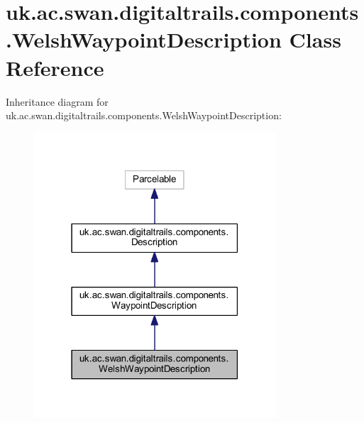 \hypertarget{classuk_1_1ac_1_1swan_1_1digitaltrails_1_1components_1_1_welsh_waypoint_description}{\section{uk.\+ac.\+swan.\+digitaltrails.\+components.\+Welsh\+Waypoint\+Description Class Reference}
\label{classuk_1_1ac_1_1swan_1_1digitaltrails_1_1components_1_1_welsh_waypoint_description}
}


Inheritance diagram for uk.\+ac.\+swan.\+digitaltrails.\+components.\+Welsh\+Waypoint\+Description\+:\nopagebreak
\begin{figure}[H]
\begin{center}
\leavevmode
\includegraphics[width=255pt]{classuk_1_1ac_1_1swan_1_1digitaltrails_1_1components_1_1_welsh_waypoint_description__inherit__graph}
\end{center}
\end{figure}


